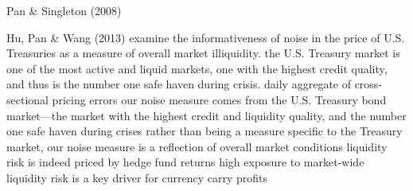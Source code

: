 Pan \& Singleton (2008)

Hu, Pan \& Wang (2013)
examine the informativeness of noise in the price of U.S. Treasuries as a measure of overall market illiquidity.
the U.S. Treasury market is one of the most active and liquid markets, one with the highest credit quality, and thus is the number one safe haven during crisis.
daily aggregate of cross-sectional pricing errors
our noise measure comes from the U.S. Treasury bond market—the market with the highest credit and liquidity quality, and the number one safe haven during crises
rather than being a measure speciﬁc to the Treasury market, our noise measure is a reﬂection of overall market conditions
liquidity risk is indeed priced by hedge fund returns
high exposure to market-wide liquidity risk is a key driver for currency carry proﬁts